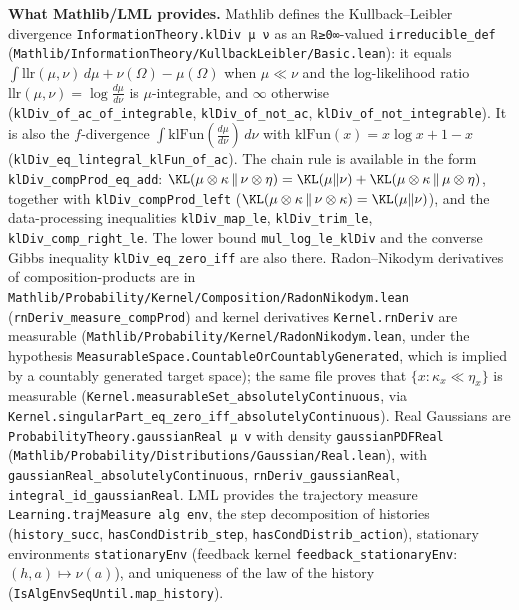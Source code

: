 \textbf{What Mathlib/LML provides.} Mathlib defines the Kullback--Leibler divergence
\texttt{InformationTheory.klDiv μ ν} as an \texttt{ℝ≥0∞}-valued \texttt{irreducible\_def}
(\texttt{Mathlib/InformationTheory/KullbackLeibler/Basic.lean}): it equals
$\int \mathrm{llr}(\mu,\nu)\,d\mu + \nu(\Omega) - \mu(\Omega)$ when $\mu \ll \nu$ and the
log-likelihood ratio $\mathrm{llr}(\mu,\nu) = \log \frac{d\mu}{d\nu}$ is $\mu$-integrable, and
$\infty$ otherwise (\texttt{klDiv\_of\_ac\_of\_integrable}, \texttt{klDiv\_of\_not\_ac},
\texttt{klDiv\_of\_not\_integrable}). It is also the $f$-divergence
$\int \mathrm{klFun}(\frac{d\mu}{d\nu})\,d\nu$ with $\mathrm{klFun}(x) = x\log x + 1 - x$
(\texttt{klDiv\_eq\_lintegral\_klFun\_of\_ac}). The chain rule is available in the form
\texttt{klDiv\_compProd\_eq\_add}:
$\KL(\mu \otimes \kappa \,\|\, \nu \otimes \eta) = \KL(\mu\|\nu) + \KL(\mu\otimes\kappa\,\|\,\mu\otimes\eta)$,
together with \texttt{klDiv\_compProd\_left} ($\KL(\mu\otimes\kappa\,\|\,\nu\otimes\kappa) = \KL(\mu\|\nu)$),
and the data-processing inequalities \texttt{klDiv\_map\_le}, \texttt{klDiv\_trim\_le},
\texttt{klDiv\_comp\_right\_le}. The lower bound \texttt{mul\_log\_le\_klDiv} and the converse
Gibbs inequality \texttt{klDiv\_eq\_zero\_iff} are also there. Radon--Nikodym derivatives of
composition-products are in \texttt{Mathlib/Probability/Kernel/Composition/RadonNikodym.lean}
(\texttt{rnDeriv\_measure\_compProd}) and kernel derivatives \texttt{Kernel.rnDeriv} are
measurable (\texttt{Mathlib/Probability/Kernel/RadonNikodym.lean}, under the hypothesis
\texttt{MeasurableSpace.CountableOrCountablyGenerated}, which is implied by a countably
generated target space); the same file proves that $\{x : \kappa_x \ll \eta_x\}$ is
measurable (\texttt{Kernel.measurableSet\_absolutelyContinuous}, via
\texttt{Kernel.singularPart\_eq\_zero\_iff\_absolutelyContinuous}). Real Gaussians are
\texttt{ProbabilityTheory.gaussianReal μ v} with density \texttt{gaussianPDFReal}
(\texttt{Mathlib/Probability/Distributions/Gaussian/Real.lean}), with
\texttt{gaussianReal\_absolutelyContinuous}, \texttt{rnDeriv\_gaussianReal},
\texttt{integral\_id\_gaussianReal}. LML provides the trajectory measure
\texttt{Learning.trajMeasure alg env}, the step decomposition of histories
(\texttt{history\_succ}, \texttt{hasCondDistrib\_step}, \texttt{hasCondDistrib\_action}),
stationary environments \texttt{stationaryEnv} (feedback kernel
\texttt{feedback\_stationaryEnv}: $(h,a) \mapsto \nu(a)$), and uniqueness of the law of the
history (\texttt{IsAlgEnvSeqUntil.map\_history}).

